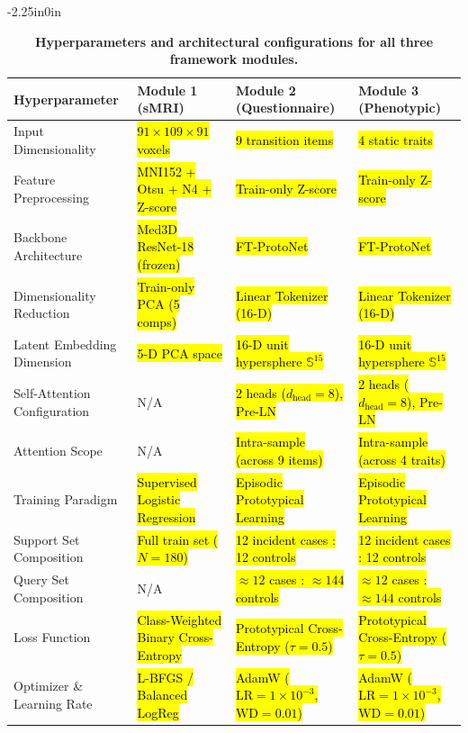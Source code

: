 \documentclass[10pt,letterpaper]{article}
\begin{document}
\begin{table}[!t]
\begin{adjustwidth}{-2.25in}{0in}
\centering
\caption{\textbf{Hyperparameters and architectural configurations for all three framework modules.}}
\label{tab:hyperparams}
\footnotesize
\renewcommand{\arraystretch}{1.15}
\begin{tabular}{|p{3.8cm}|p{3.5cm}|p{3.5cm}|p{3.5cm}|}
\hline
\textbf{Hyperparameter} & \textbf{Module 1 (sMRI)} & \textbf{Module 2 (Questionnaire)} & \textbf{Module 3 (Phenotypic)} \\
\hline
Input Dimensionality & \hl{$91 \times 109 \times 91$ voxels} & \hl{9 transition items} & \hl{4 static traits} \\
\hline
Feature Preprocessing & \hl{MNI152 + Otsu + N4 + Z-score} & \hl{Train-only Z-score} & \hl{Train-only Z-score} \\
\hline
Backbone Architecture & \hl{Med3D ResNet-18 (frozen)} & \hl{FT-ProtoNet} & \hl{FT-ProtoNet} \\
\hline
Dimensionality Reduction & \hl{Train-only PCA (5 comps)} & \hl{Linear Tokenizer (16-D)} & \hl{Linear Tokenizer (16-D)} \\
\hline
Latent Embedding Dimension & \hl{5-D PCA space} & \hl{16-D unit hypersphere $\mathbb{S}^{15}$} & \hl{16-D unit hypersphere $\mathbb{S}^{15}$} \\
\hline
Self-Attention Configuration & N/A & \hl{2 heads ($d_{\text{head}} = 8$), Pre-LN} & \hl{2 heads ($d_{\text{head}} = 8$), Pre-LN} \\
\hline
Attention Scope & N/A & \hl{Intra-sample (across 9 items)} & \hl{Intra-sample (across 4 traits)} \\
\hline
Training Paradigm & \hl{Supervised Logistic Regression} & \hl{Episodic Prototypical Learning} & \hl{Episodic Prototypical Learning} \\
\hline
Support Set Composition & \hl{Full train set ($N=180$)} & \hl{12 incident cases : 12 controls} & \hl{12 incident cases : 12 controls} \\
\hline
Query Set Composition & N/A & \hl{$\approx 12$ cases : $\approx 144$ controls} & \hl{$\approx 12$ cases : $\approx 144$ controls} \\
\hline
Loss Function & \hl{Class-Weighted Binary Cross-Entropy} & \hl{Prototypical Cross-Entropy ($\tau=0.5$)} & \hl{Prototypical Cross-Entropy ($\tau=0.5$)} \\
\hline
Optimizer \& Learning Rate & \hl{L-BFGS / Balanced LogReg} & \hl{AdamW ($\text{LR} = 1 \times 10^{-3}$, $\text{WD} = 0.01$)} & \hl{AdamW ($\text{LR} = 1 \times 10^{-3}$, $\text{WD} = 0.01$)} \\

\end{tabular}
\end{adjustwidth}
\end{table}
\end{document}
